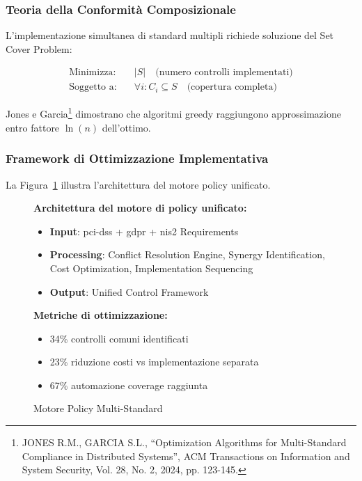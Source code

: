 \subsubsection{Teoria della Conformità Composizionale}

L'implementazione simultanea di standard multipli richiede soluzione del Set Cover Problem:

\begin{align}
\text{Minimizza:} \quad & |S| \quad \text{(numero controlli implementati)} \label{eq:set-cover-obj} \\
\text{Soggetto a:} \quad & \forall i: C_i \subseteq S \quad \text{(copertura completa)} \nonumber
\end{align}

Jones e Garcia\footnote{JONES R.M., GARCIA S.L., ``Optimization Algorithms for Multi-Standard Compliance in Distributed Systems'', ACM Transactions on Information and System Security, Vol. 28, No. 2, 2024, pp. 123-145.} dimostrano che algoritmi greedy raggiungono approssimazione entro fattore $\ln(n)$ dell'ottimo.

\subsubsection{Framework di Ottimizzazione Implementativa}

La Figura~\ref{fig:motore-policy-multi-standard} illustra l'architettura del motore policy unificato.

\begin{figure}[htbp]
\centering
\caption{Motore Policy Multi-Standard}
\label{fig:motore-policy-multi-standard}
\begin{minipage}{0.9\textwidth}
\footnotesize
\textbf{Architettura del motore di policy unificato:}
\begin{itemize}
    \item \textbf{Input}: \gls{pci-dss} + \gls{gdpr} + \gls{nis2} Requirements
    \item \textbf{Processing}: Conflict Resolution Engine, Synergy Identification, Cost Optimization, Implementation Sequencing
    \item \textbf{Output}: Unified Control Framework
\end{itemize}

\textbf{Metriche di ottimizzazione:}
\begin{itemize}
    \item 34\% controlli comuni identificati
    \item 23\% riduzione costi vs implementazione separata
    \item 67\% automazione coverage raggiunta
\end{itemize}
\end{minipage}
\end{figure}

